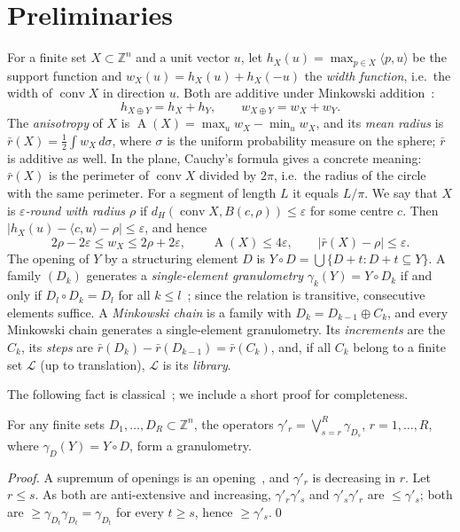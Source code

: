 \documentclass[runningheads]{llncs}
\newcommand{\Z}{\mathbb{Z}}
\newcommand{\conv}{\operatorname{conv}}
\newcommand{\A}{\operatorname{A}}
\newcommand{\dH}{d_H}
\begin{document}
\section{Preliminaries}\label{sec:prelim}
For a finite set $X\subset\Z^n$ and a unit vector $u$, let $h_X(u)=\max_{p\in X}\langle p,u\rangle$ be the support function and $w_X(u)=h_X(u)+h_X(-u)$ the \emph{width function}, i.e.\ the width of $\conv X$ in direction $u$. Both are additive under Minkowski addition~\cite{schneider2014}:
\begin{equation}\label{eq:additive}
h_{X\oplus Y}=h_X+h_Y,\qquad w_{X\oplus Y}=w_X+w_Y .
\end{equation}
The \emph{anisotropy} of $X$ is $\A(X)=\max_uw_X-\min_uw_X$, and its \emph{mean radius} is $\bar r(X)=\frac12\int w_X\,d\sigma$, where $\sigma$ is the uniform probability measure on the sphere; $\bar r$ is additive as well. In the plane, Cauchy's formula gives a concrete meaning: $\bar r(X)$ is the perimeter of $\conv X$ divided by $2\pi$, i.e.\ the radius of the circle with the same perimeter. For a segment of length $L$ it equals $L/\pi$. We say that $X$ is \emph{$\varepsilon$-round with radius $\rho$} if $\dH(\conv X,B(c,\rho))\le\varepsilon$ for some centre $c$. Then $|h_X(u)-\langle c,u\rangle-\rho|\le\varepsilon$, and hence
\begin{equation}\label{eq:round}
2\rho-2\varepsilon\le w_X\le2\rho+2\varepsilon,\qquad \A(X)\le4\varepsilon,\qquad|\bar r(X)-\rho|\le\varepsilon .
\end{equation}
The opening of $Y$ by a structuring element $D$ is $Y\circ D=\bigcup\{D+t: D+t\subseteq Y\}$. A family $(D_k)$ generates a \emph{single-element granulometry} $\gamma_k(Y)=Y\circ D_k$ if and only if $D_l\circ D_k=D_l$ for all $k\le l$~\cite{matheron1975,serra1982}; since the relation is transitive, consecutive elements suffice. A \emph{Minkowski chain} is a family with $D_k=D_{k-1}\oplus C_k$, and every Minkowski chain generates a single-element granulometry. Its \emph{increments} are the $C_k$, its \emph{steps} are $\bar r(D_k)-\bar r(D_{k-1})=\bar r(C_k)$, and, if all $C_k$ belong to a finite set $\mathcal L$ (up to translation), $\mathcal L$ is its \emph{library}.

The following fact is classical~\cite{matheron1975,serra1982}; we include a short proof for completeness.

\begin{proposition}\label{prop:sup}
For any finite sets $D_1,\dots,D_R\subset\Z^n$, the operators $\gamma'_r=\bigvee_{s=r}^R\gamma_{D_s}$, $r=1,\dots,R$, where $\gamma_{D}(Y)=Y\circ D$, form a granulometry.
\end{proposition}
\begin{proof}
A supremum of openings is an opening~\cite{serra1982}, and $\gamma'_r$ is decreasing in $r$. Let $r\le s$. As both are anti-extensive and increasing, $\gamma'_r\gamma'_s$ and $\gamma'_s\gamma'_r$ are $\le\gamma'_s$; both are $\ge\gamma_{D_t}\gamma_{D_t}=\gamma_{D_t}$ for every $t\ge s$, hence $\ge\gamma'_s$.\qed
\end{proof}
\end{document}
